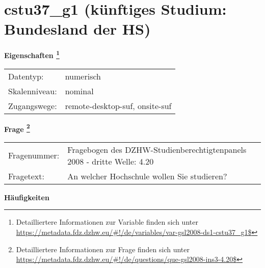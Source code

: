 
    \setcounter{footnote}{0}

    \vspace*{-1.8cm}
	\section{cstu37\_g1 (künftiges Studium: Bundesland der HS)}
	\label{section:cstu37_g1}



    \vspace*{0.5cm}
    \noindent\textbf{Eigenschaften
	\footnote{Detailliertere Informationen zur Variable finden sich unter
		\url{https://metadata.fdz.dzhw.eu/\#!/de/variables/var-gsl2008-ds1-cstu37_g1$}}}\\
	\begin{tabularx}{\hsize}{@{}lX}
	Datentyp: & numerisch \\
	Skalenniveau: & nominal \\
	Zugangswege: &
	  remote-desktop-suf, 
	  onsite-suf
 \\
    \end{tabularx}



				\vspace*{0.5cm}
                \noindent\textbf{Frage
	                \footnote{Detailliertere Informationen zur Frage finden sich unter
		              \url{https://metadata.fdz.dzhw.eu/\#!/de/questions/que-gsl2008-ins3-4.20$}}}\\
				\begin{tabularx}{\hsize}{@{}lX}
					Fragenummer: &
					  Fragebogen des DZHW-Studienberechtigtenpanels 2008 - dritte Welle:
					  4.20
 \\
					Fragetext: & An welcher Hochschule wollen Sie studieren? \\
				\end{tabularx}





        		\vspace*{0.5cm}
                \noindent\textbf{Häufigkeiten}

